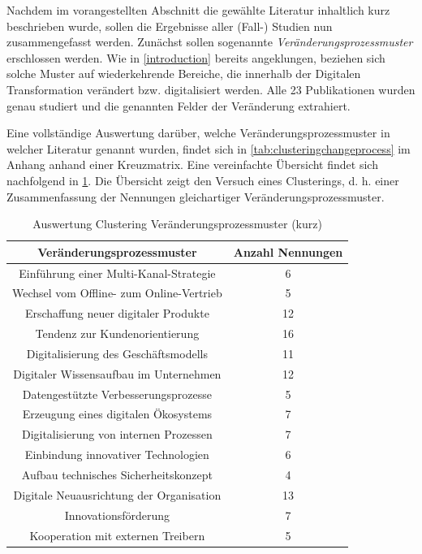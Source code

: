 Nachdem im vorangestellten Abschnitt die  gewählte Literatur inhaltlich kurz  beschrieben wurde, sollen die Ergebnisse aller (Fall-) Studien nun zusammengefasst werden. Zunächst sollen sogenannte \textit{Veränderungsprozessmuster} erschlossen werden. Wie in \ref{introduction} bereits angeklungen, beziehen sich solche Muster auf wiederkehrende Bereiche, die innerhalb der Digitalen Transformation verändert bzw. digitalisiert werden. Alle 23 Publikationen wurden genau studiert  und die genannten Felder der Veränderung extrahiert.

Eine vollständige Auswertung darüber, welche Veränderungsprozessmuster in welcher Literatur genannt wurden, findet sich in \ref{tab:clusteringchangeprocess} im Anhang anhand einer Kreuzmatrix. Eine vereinfachte Übersicht findet sich nachfolgend in \ref{tab:clusteringvpshort}. Die Übersicht zeigt den Versuch eines Clusterings, d. h. einer Zusammenfassung der Nennungen gleichartiger  Veränderungsprozessmuster. 

\begin{table}[ht]
	\centering
	\caption{Auswertung Clustering Veränderungsprozessmuster (kurz)}
	\begin{tabular}{|c|c|}
		\hline
		\textbf{Veränderungsprozessmuster}& \textbf{Anzahl Nennungen} \\
		\hline
		Einführung einer Multi-Kanal-Strategie   & 6  \\
		Wechsel vom Offline- zum Online-Vertrieb & 5  \\
		Erschaffung neuer digitaler Produkte     & 12 \\
		Tendenz zur Kundenorientierung           & 16 \\
		Digitalisierung des Geschäftsmodells     & 11 \\
		Digitaler Wissensaufbau im Unternehmen   & 12 \\
		Datengestützte Verbesserungsprozesse     & 5  \\
		Erzeugung eines digitalen Ökosystems     & 7  \\
		Digitalisierung von internen Prozessen   & 7  \\
		Einbindung innovativer Technologien      & 6  \\
		Aufbau technisches Sicherheitskonzept    & 4  \\
		Digitale Neuausrichtung der Organisation & 13 \\
		Innovationsförderung                     & 7  \\
		Kooperation mit externen Treibern        & 5 \\
		\hline
	\end{tabular}
	\label{tab:clusteringvpshort}
\end{table}

